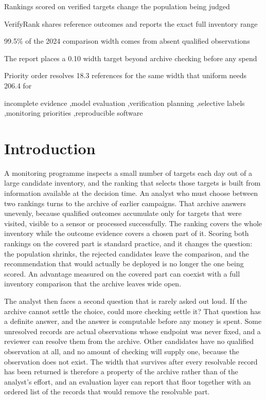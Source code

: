 \documentclass[a4paper,fleqn,longmktitle]{cas-sc}
\begin{document}
\begin{highlights}
\item Rankings scored on verified targets change the population being judged
\item VerifyRank shares reference outcomes and reports the exact full inventory range
\item 99.5\% of the 2024 comparison width comes from absent qualified observations
\item The report places a 0.10 width target beyond archive checking before any spend
\item Priority order resolves 18.3 references for the same width that uniform needs 206.4 for
\end{highlights}

\begin{keywords}
incomplete evidence \sep model evaluation \sep verification planning \sep selective labels \sep monitoring priorities \sep reproducible software
\end{keywords}

\maketitle

\section{Introduction}\label{sec:intro}

A monitoring programme inspects a small number of targets each day out of a large candidate inventory, and the ranking that selects those targets is built from information available at the decision time. An analyst who must choose between two rankings turns to the archive of earlier campaigns. That archive answers unevenly, because qualified outcomes accumulate only for targets that were visited, visible to a sensor or processed successfully. The ranking covers the whole inventory while the outcome evidence covers a chosen part of it. Scoring both rankings on the covered part is standard practice, and it changes the question: the population shrinks, the rejected candidates leave the comparison, and the recommendation that would actually be deployed is no longer the one being scored. An advantage measured on the covered part can coexist with a full inventory comparison that the archive leaves wide open.

The analyst then faces a second question that is rarely asked out loud. If the archive cannot settle the choice, could more checking settle it? That question has a definite answer, and the answer is computable before any money is spent. Some unresolved records are actual observations whose endpoint was never fixed, and a reviewer can resolve them from the archive. Other candidates have no qualified observation at all, and no amount of checking will supply one, because the observation does not exist. The width that survives after every resolvable record has been returned is therefore a property of the archive rather than of the analyst's effort, and an evaluation layer can report that floor together with an ordered list of the records that would remove the resolvable part.
\end{document}
